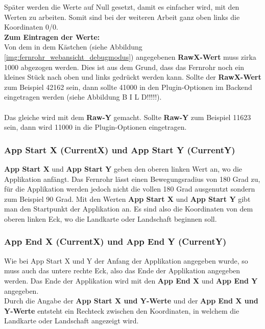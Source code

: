 Später werden die Werte auf Null gesetzt, damit es einfacher wird, mit den Werten zu arbeiten. Somit sind bei der weiteren Arbeit ganz oben links die Koordinaten 0/0.\\


\textbf{Zum Eintragen der Werte:}\\

Von dem in dem Kästchen (siehe Abbildung \ref{img:fernrohr_webansicht_debugmodus}) angegebenen \textbf{RawX-Wert} muss zirka 1000 abgezogen werden. Dies ist aus dem Grund, dass das Fernrohr noch ein kleines Stück nach oben und links gedrückt werden kann. Sollte der \textbf{RawX-Wert} zum Beispiel 42162 sein, dann sollte 41000 in den Plugin-Optionen im Backend eingetragen werden (siehe Abbildung B I L D!!!!!).\\
\\
Das gleiche wird mit dem \textbf{Raw-Y} gemacht. Sollte \textbf{Raw-Y} zum Beispiel 11623 sein, dann wird 11000 in die Plugin-Optionen eingetragen.

\subsubsection{App Start X (CurrentX) und App Start Y (CurrentY)}

\textbf{App Start X} und \textbf{App Start Y} geben den oberen linken Wert an, wo die Applikation anfängt. Das Fernrohr lässt einen Bewegungsradius von 180 Grad zu, für die Applikation werden jedoch nicht die vollen 180 Grad ausgenutzt sondern zum Beispiel 90 Grad. Mit den Werten \textbf{App Start X} und \textbf{App Start Y} gibt man den Startpunkt der Applikation an. Es sind also die Koordinaten von dem oberen linken Eck, wo die Landkarte oder Landschaft beginnen soll.

\subsubsection{App End X (CurrentX) und App End Y (CurrentY)}

Wie bei App Start X und Y der Anfang der Applikation angegeben wurde, so muss auch das untere rechte Eck, also das Ende der Applikation angegeben werden. Das Ende der Applikation wird mit den \textbf{App End X} und \textbf{App End Y} angegeben.\\

Durch die Angabe der \textbf{App Start X und Y-Werte} und der \textbf{App End X und Y-Werte} entsteht ein Rechteck zwischen den Koordinaten, in welchem die Landkarte oder Landschaft angezeigt wird.



